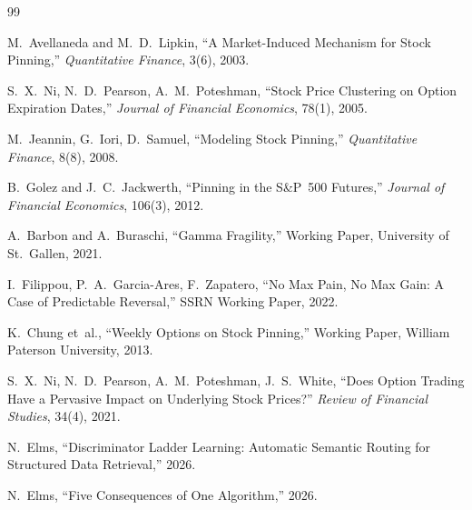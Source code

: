 \documentclass[11pt]{article}
\begin{document}
\begin{thebibliography}{99}

M.~Avellaneda and M.~D.~Lipkin, ``A Market-Induced Mechanism for Stock Pinning,'' \textit{Quantitative Finance}, 3(6), 2003.

S.~X.~Ni, N.~D.~Pearson, A.~M.~Poteshman, ``Stock Price Clustering on Option Expiration Dates,'' \textit{Journal of Financial Economics}, 78(1), 2005.

M.~Jeannin, G.~Iori, D.~Samuel, ``Modeling Stock Pinning,'' \textit{Quantitative Finance}, 8(8), 2008.

B.~Golez and J.~C.~Jackwerth, ``Pinning in the S\&P~500 Futures,'' \textit{Journal of Financial Economics}, 106(3), 2012.

A.~Barbon and A.~Buraschi, ``Gamma Fragility,'' Working Paper, University of St.~Gallen, 2021.

I.~Filippou, P.~A.~Garcia-Ares, F.~Zapatero, ``No Max Pain, No Max Gain: A Case of Predictable Reversal,'' SSRN Working Paper, 2022.

K.~Chung et~al., ``Weekly Options on Stock Pinning,'' Working Paper, William Paterson University, 2013.

S.~X.~Ni, N.~D.~Pearson, A.~M.~Poteshman, J.~S.~White, ``Does Option Trading Have a Pervasive Impact on Underlying Stock Prices?'' \textit{Review of Financial Studies}, 34(4), 2021.

N.~Elms, ``Discriminator Ladder Learning: Automatic Semantic Routing for Structured Data Retrieval,'' 2026.

N.~Elms, ``Five Consequences of One Algorithm,'' 2026.

\end{thebibliography}
\end{document}
